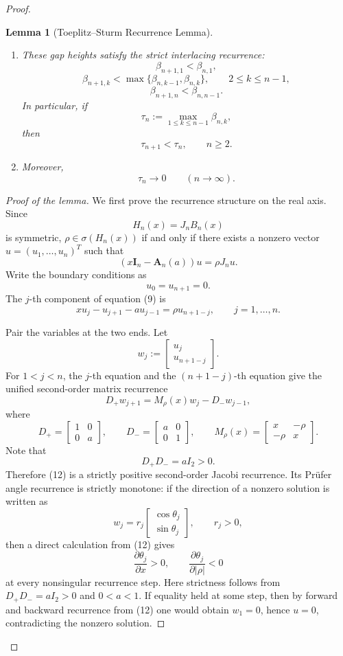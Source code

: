 \documentclass[11pt]{article}
\newtheorem{lemma}[theorem]{Lemma}
\newcommand{\A}{\mathbf A}
\newcommand{\I}{\mathbf I}
\begin{document}
\begin{proof}
\begin{lemma}[Toeplitz--Sturm Recurrence Lemma]
\begin{enumerate}
\item These gap heights satisfy the strict interlacing recurrence:
\[
\beta_{n+1,1}<\beta_{n,1},
\tag{5a}
\]
\[
\beta_{n+1,k}<\max\{\beta_{n,k-1},\beta_{n,k}\},
\qquad 2\le k\le n-1,
\tag{5b}
\]
\[
\beta_{n+1,n}<\beta_{n,n-1}.
\tag{5c}
\]
In particular, if
\[
\tau_n:=\max_{1\le k\le n-1}\beta_{n,k},
\tag{6}
\]
then
\[
\tau_{n+1}<\tau_n,\qquad n\ge2.
\tag{7}
\]

\item Moreover,
\[
\tau_n\longrightarrow0\qquad(n\to\infty).
\tag{8}
\]
\end{enumerate}
\end{lemma}

\begin{proof}[Proof of the lemma]
We first prove the recurrence structure on the real axis. Since
\[
H_n(x)=J_nB_n(x)
\]
is symmetric, \(\rho\in\sigma(H_n(x))\) if and only if there exists a nonzero vector \(u=(u_1,\dots,u_n)^T\) such that
\[
(x\I_n-\A_n(a))u=\rho J_nu.
\tag{9}
\]
Write the boundary conditions as
\[
u_0=u_{n+1}=0.
\tag{10}
\]
The \(j\)-th component of equation (9) is
\[
xu_j-u_{j+1}-a u_{j-1}=\rho u_{n+1-j},
\qquad j=1,\dots,n.
\tag{11}
\]

Pair the variables at the two ends. Let
\[
w_j:=
\begin{bmatrix}
u_j\\
u_{n+1-j}
\end{bmatrix}.
\]
For \(1<j<n\), the \(j\)-th equation and the \((n+1-j)\)-th equation give the unified second-order matrix recurrence
\[
D_+w_{j+1}
=
M_\rho(x)w_j-D_-w_{j-1},
\tag{12}
\]
where
\[
D_+=
\begin{bmatrix}
1&0\\
0&a
\end{bmatrix},
\qquad
D_-=
\begin{bmatrix}
a&0\\
0&1
\end{bmatrix},
\qquad
M_\rho(x)=
\begin{bmatrix}
x&-\rho\\
-\rho&x
\end{bmatrix}.
\tag{13}
\]
Note that
\[
D_+D_-=aI_2>0.
\tag{14}
\]
Therefore (12) is a strictly positive second-order Jacobi recurrence. Its Prüfer angle recurrence is strictly monotone: if the direction of a nonzero solution is written as
\[
w_j=r_j
\begin{bmatrix}
\cos\theta_j\\
\sin\theta_j
\end{bmatrix},
\qquad r_j>0,
\]
then a direct calculation from (12) gives
\[
\frac{\partial\theta_j}{\partial x}>0,
\qquad
\frac{\partial\theta_j}{\partial |\rho|}<0
\tag{15}
\]
at every nonsingular recurrence step. Here strictness follows from \(D_+D_-=aI_2>0\) and \(0<a<1\). If equality held at some step, then by forward and backward recurrence from (12) one would obtain \(w_1=0\), hence \(u=0\), contradicting the nonzero solution.


\end{proof}
\end{proof}
\end{document}

